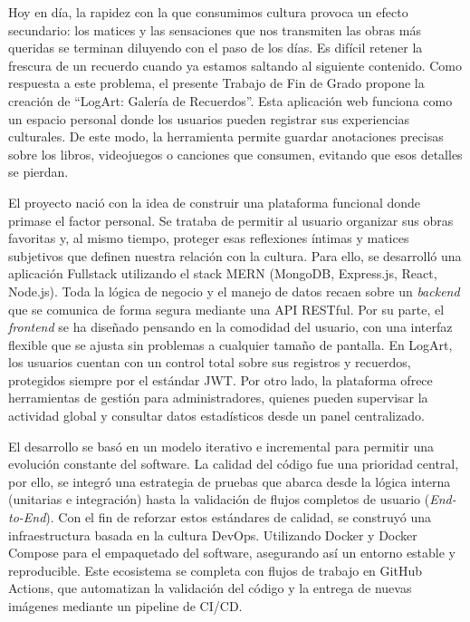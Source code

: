 \documentclass[11pt,twoside,titlepage]{report}
\begin{document}
Hoy en día, la rapidez con la que consumimos cultura provoca un efecto secundario: los matices y las sensaciones que nos transmiten las obras más queridas se terminan diluyendo con el paso de los días. Es difícil retener la frescura de un recuerdo cuando ya estamos saltando al siguiente contenido. Como respuesta a este problema, el presente Trabajo de Fin de Grado propone la creación de ``LogArt: Galería de Recuerdos''. Esta aplicación web funciona como un espacio personal donde los usuarios pueden registrar sus experiencias culturales. De este modo, la herramienta permite guardar anotaciones precisas sobre los libros, videojuegos o canciones que consumen, evitando que esos detalles se pierdan.

El proyecto nació con la idea de construir una plataforma funcional donde primase el factor personal. Se trataba de permitir al usuario organizar sus obras favoritas y, al mismo tiempo, proteger esas reflexiones íntimas y matices subjetivos que definen nuestra relación con la cultura. Para ello, se desarrolló una aplicación Fullstack utilizando el stack MERN (MongoDB, Express.js, React, Node.js). Toda la lógica de negocio y el manejo de datos recaen sobre un \textit{backend} que se comunica de forma segura mediante una API RESTful. Por su parte, el \textit{frontend} se ha diseñado pensando en la comodidad del usuario, con una interfaz flexible que se ajusta sin problemas a cualquier tamaño de pantalla. En LogArt, los usuarios cuentan con un control total sobre sus registros y recuerdos, protegidos siempre por el estándar JWT. Por otro lado, la plataforma ofrece herramientas de gestión para administradores, quienes pueden supervisar la actividad global y consultar datos estadísticos desde un panel centralizado.

El desarrollo se basó en un modelo iterativo e incremental para permitir una evolución constante del software. La calidad del código fue una prioridad central, por ello, se integró una estrategia de pruebas que abarca desde la lógica interna (unitarias e integración) hasta la validación de flujos completos de usuario (\textit{End-to-End}). Con el fin de reforzar estos estándares de calidad, se construyó una infraestructura basada en la cultura DevOps. Utilizando Docker y Docker Compose para el empaquetado del software, asegurando así un entorno estable y reproducible. Este ecosistema se completa con flujos de trabajo en GitHub Actions, que automatizan la validación del código y la entrega de nuevas imágenes mediante un pipeline de CI/CD.
\end{document}

